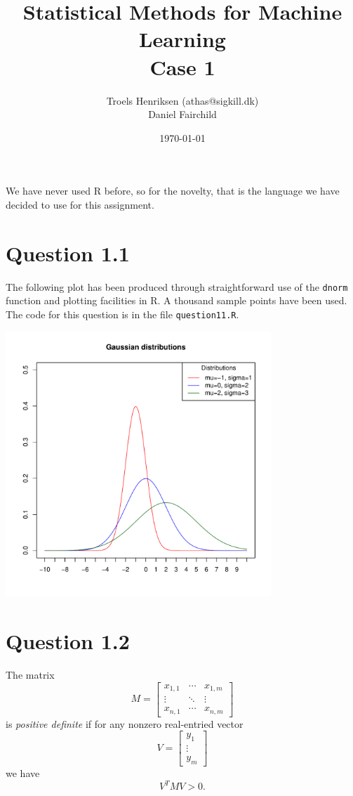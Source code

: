 \documentclass[a4paper, oneside, final]{memoir}
\title{Statistical Methods for Machine Learning\\Case 1}
\author{Troels Henriksen (athas@sigkill.dk) \\ Daniel Fairchild}
\date{\today}
\begin{document}
\maketitle

We have never used R before, so for the novelty, that is the language
we have decided to use for this assignment.

\section*{Question 1.1}

The following plot has been produced through straightforward use of
the \texttt{dnorm} function and plotting facilities in R.  A thousand
sample points have been used.  The code for this question is in the
file \texttt{question11.R}.

\includegraphics[width=10cm]{img/question11-plot.pdf}

\section*{Question 1.2}

The matrix
\[
M=\left[\begin{matrix}
  x_{1,1}&\cdots&x_{1,m}\\\vdots&\ddots&\vdots\\x_{n,1}&\cdots&x_{n,m} \end{matrix}\right]
\]
is \textit{positive definite} if for any nonzero real-entried vector
\[
V=\left[\begin{matrix} y_1 \\ \vdots \\ y_m \end{matrix}\right]
\]
we have
\[
V^TMV > 0.
\]
\end{document}
